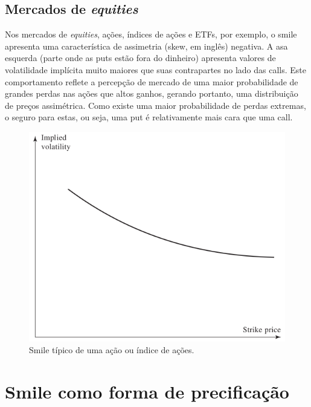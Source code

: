 \documentclass[]{book}
\theoremstyle{definition}
\theoremstyle{definition}
\theoremstyle{definition}
\theoremstyle{remark}
\begin{document}
\hypertarget{mercados-de-equities}{%
\subsection{\texorpdfstring{Mercados de \emph{equities}}{Mercados de equities}}\label{mercados-de-equities}}

Nos mercados de \emph{equities}, ações, índices de ações e ETFs, por exemplo, o smile apresenta uma característica de assimetria (skew, em inglês) negativa. A asa esquerda (parte onde as puts estão fora do dinheiro) apresenta valores de volatilidade implícita muito maiores que suas contrapartes no lado das calls. Este comportamento reflete a percepção de mercado de uma maior probabilidade de grandes perdas nas ações que altos ganhos, gerando portanto, uma distribuição de preços assimétrica. Como existe uma maior probabilidade de perdas extremas, o seguro para estas, ou seja, uma put é relativamente mais cara que uma call.

\begin{figure}
\centering
\includegraphics{./images/smile_equities.png}
\caption{\label{fig:smile-equities}Smile típico de uma ação ou índice de ações.}
\end{figure}

\hypertarget{smileprecificacao}{%
\section{Smile como forma de precificação}\label{smileprecificacao}}
\end{document}
